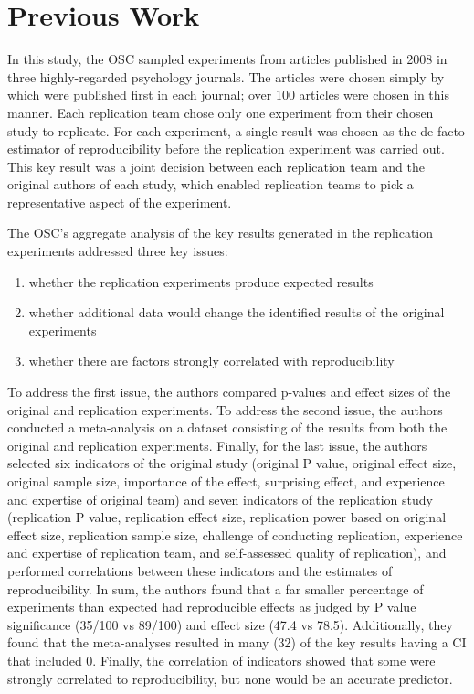 \documentclass{article}
\begin{document}
\section{Previous Work}
In this study, the OSC sampled experiments from articles published in 2008 in three highly-regarded psychology journals. The articles were chosen simply by which were published first in each journal; over 100 articles were chosen in this manner. Each replication team chose only one experiment from their chosen study to replicate. For each experiment, a single result was chosen as the de facto estimator of reproducibility before the replication experiment was carried out. This key result was a joint decision between each replication team and the original authors of each study, which enabled replication teams to pick a representative aspect of the experiment.
\par
The OSC’s aggregate analysis of the key results generated in the replication experiments addressed three key issues: \begin{enumerate}
    \item whether the replication experiments produce expected results
    \item whether additional data would change the identified results of the original experiments
    \item whether there are factors strongly correlated with reproducibility
\end{enumerate}
\par
To address the first issue, the authors compared p-values and effect sizes of the original and replication experiments. To address the second issue, the authors conducted a meta-analysis on a dataset consisting of the results from both the original and replication experiments. Finally, for the last issue, the authors selected six indicators of the original study (original P value, original effect size, original sample size, importance of the effect, surprising effect, and experience and expertise of original team) and seven indicators of the replication study (replication P value, replication effect size, replication power based on original effect size, replication sample size, challenge of conducting replication, experience and expertise of replication team, and self-assessed quality of replication), and performed correlations between these indicators and the estimates of reproducibility.
In sum, the authors found that a far smaller percentage of experiments than expected had reproducible effects as judged by P value significance (35/100 vs 89/100) and effect size (47.4 vs 78.5). Additionally, they found that the meta-analyses resulted in many (32) of the key results having a CI that included 0. Finally, the correlation of indicators showed that some were strongly correlated to reproducibility, but none would be an accurate predictor.
\end{document}
